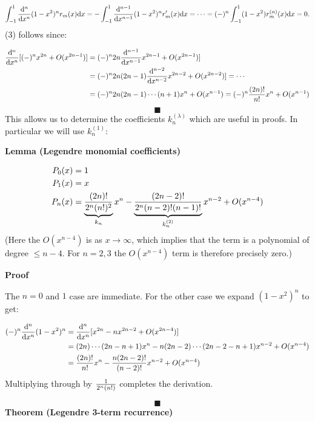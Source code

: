 \documentclass[12pt,a4paper]{article}
\begin{document}
\[
\ensuremath{\int}_{-1}^1 {{\rm d}^n \over {\rm d} x^n} (1-x^2)^n r_m(x) {\rm d}x
= -\ensuremath{\int}_{-1}^1 {{\rm d}^{n-1} \over {\rm d} x^{n-1}} (1-x^2)^n r_m'(x) {\rm d}x =
\ensuremath{\cdots} = (-)^n \ensuremath{\int}_{-1}^1 (1-x^2) r_m^{(n)}(x) {\rm d}x = 0.
\]
(3) follows since:


\begin{align*}
{{\rm d}^n \over {\rm d} x^n}[(-)^n x^{2n} + O(x^{2n-1})] &=
(-)^n 2n {{\rm d}^{n-1} \over {\rm d} x^{n-1}} x^{2n-1}+ O(x^{2n-1})] \\
&=
(-)^n 2n (2n-1) {{\rm d}^{n-2} \over {\rm d} x^{n-2}} x^{2n-2}+ O(x^{2n-2})] = \ensuremath{\cdots} \\
&= (-)^n 2n (2n-1) \ensuremath{\cdots} (n+1) x^n + O(x^{n-1}) = 
(-)^n {(2n)! \over n!} x^n + O(x^{n-1})
\end{align*}
\[
\blacksquare
\]
This allows us to determine the coefficients $k_n^{(\ensuremath{\lambda})}$ which are useful in proofs. In particular we will use $k_n^{(1)}$:

\textbf{Lemma (Legendre monomial coefficients)}


\begin{align*}
P_0(x) &= 1 \\
P_1(x) &= x \\
P_n(x) &= \underbrace{{(2n)! \over 2^n (n!)^2}}_{k_n} x^n - \underbrace{(2n-2)! \over 2^n (n-2)! (n-1)!}_{k_n^{(2)}} x^{n-2} + O(x^{n-4})
\end{align*}
(Here the $O(x^{n-4})$ is as $x \ensuremath{\rightarrow} \ensuremath{\infty}$, which implies that the term is a polynomial of degree $\ensuremath{\leq} n-4$. For $n = 2,3$ the $O(x^{n-4})$ term is therefore precisely zero.)

\textbf{Proof}

The $n=0$ and $1$ case are immediate. For the other case we expand $(1-x^2)^n$ to get:


\begin{align*}
(-)^n {{\rm d}^n \over {\rm d} x^n} (1-x^2)^n &=
{{\rm d}^n \over {\rm d} x^n} [ x^{2n} - n x^{2n-2} + O(x^{2n-4})]\\
&= (2n)\ensuremath{\cdots}(2n-n+1) x^n - n (2n-2)\ensuremath{\cdots}(2n-2-n+1) x^{n-2} + O(x^{n-4}) \\
&= {(2n)! \over n!} x^n - {n (2n-2)! \over (n-2)!} x^{n-2} + O(x^{n-4})
\end{align*}
Multiplying through by ${1 \over 2^n (n!)}$ completes the derivation.

\[
\blacksquare
\]
\textbf{Theorem (Legendre 3-term recurrence)}
\end{document}
